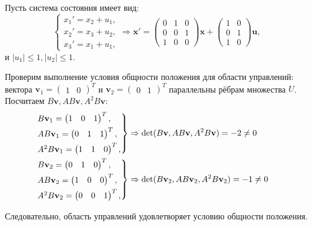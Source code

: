 \begin{example}
  Пусть система состояния имеет вид:
  \[
    \begin{cases}
      x_1' = x_2 + u_1,\\
      x_2' = x_3 + u_2,\\
      x_3' = x_1 + u_1,
    \end{cases}
    \Rightarrow
    \mathbf{x}' = \begin{pmatrix} 0 & 1 & 0 \\ 0 & 0 & 1 \\ 1 & 0 & 0 \end{pmatrix} \mathbf{x} +
    \begin{pmatrix} 1 & 0 \\ 0 & 1 \\ 1 & 0 \end{pmatrix} \mathbf{u},
  \]
  и $|u_1| \leqslant 1, |u_2| \leqslant 1$.

  Проверим выполнение условия общности положения для области управлений:
  вектора $\mathbf{v}_1 = \begin{pmatrix} 1 & 0 \end{pmatrix}^T$ и
  $\mathbf{v}_2 = \begin{pmatrix} 0 & 1 \end{pmatrix}^T$ параллельны рёбрам множества $U$.
  Посчитаем $B\mathbf{v}, AB\mathbf{v}, A^2 B \mathbf{v}$:
  \begin{align*}
    \begin{rcases}
      B\mathbf{v}_1 = \begin{pmatrix} 1 & 0 & 1 \end{pmatrix}^T, \\
      AB\mathbf{v}_1 = \begin{pmatrix} 0 & 1 & 1 \end{pmatrix}^T, \\
      A^2 B \mathbf{v}_1 = \begin{pmatrix} 1 & 1 & 0 \end{pmatrix}^T, \\
    \end{rcases} & \Rightarrow \operatorname{det}(B\mathbf{v}, AB\mathbf{v}, A^2 B \mathbf{v}) = -2 \neq 0 \\
    \begin{rcases}
      B\mathbf{v}_2 = \begin{pmatrix} 0 & 1 & 0 \end{pmatrix}^T, \\
      AB\mathbf{v}_2 = \begin{pmatrix} 1 & 0 & 0 \end{pmatrix}^T, \\
      A^2 B \mathbf{v}_2 = \begin{pmatrix} 0 & 0 & 1 \end{pmatrix}^T,
    \end{rcases} &\Rightarrow \operatorname{det}(B\mathbf{v}_2, AB\mathbf{v}_2, A^2 B \mathbf{v}_2) = -1 \neq 0
  \end{align*}

  Следовательно, область управлений удовлетворяет условию общности положения.
\end{example}
